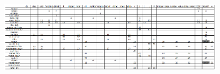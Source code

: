 \documentclass[11pt]{article}
\begin{document}
\begin{landscape}
    \begin{figure}[ht]
        \includegraphics[scale=1.89]{LL_tabulka.eps} %
    \end{figure}
\end{landscape}
\end{document}
